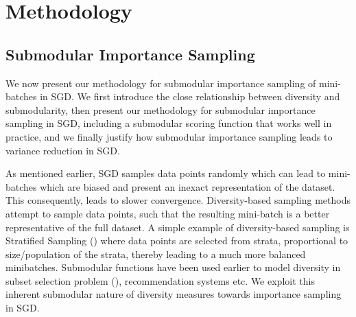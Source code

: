 \documentclass[a4paper,twoside]{iiththesis}
\theoremstyle{definition}
\theoremstyle{definition}
\newcommand{\myalgo}{Submodular-SGD\xspace}
\theoremstyle{remark}
\begin{document}
\part{Methodology}
\chapter{ Submodular Importance Sampling}
We now present our methodology for submodular importance sampling of mini-batches in SGD. We first introduce the close relationship between diversity and submodularity, then present our methodology for submodular importance sampling in SGD, including a submodular scoring function that works well in practice, and we finally justify how submodular importance sampling leads to variance reduction in SGD.

As mentioned earlier, SGD samples data points randomly which can lead to mini-batches which are biased and present an inexact representation of the dataset. This consequently, leads to slower convergence. Diversity-based sampling methods attempt to sample data points, such that the resulting mini-batch is a better representative of the full dataset. A simple example of diversity-based sampling is Stratified Sampling (\cite{zhao2014accelerating}) where data points are selected from strata, proportional to size/population of the strata, thereby leading to a much more balanced minibatches. Submodular functions have been used earlier to model diversity  in subset selection problem (\cite{tschiatschek2016learning}), recommendation systems \cite{ashkan2015optimal} etc. We exploit this inherent submodular nature of diversity measures towards importance sampling in SGD.


\end{document}
